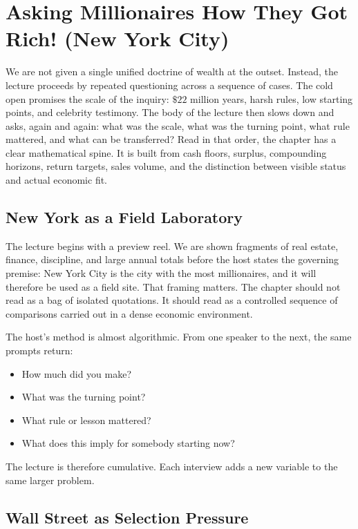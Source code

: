 \chapter{Asking Millionaires How They Got Rich! (New York City)}

We are not given a single unified doctrine of wealth at the outset. Instead, the lecture proceeds by repeated questioning across a sequence of cases. The cold open promises the scale of the inquiry: \(\$22\) million years, harsh rules, low starting points, and celebrity testimony. The body of the lecture then slows down and asks, again and again: what was the scale, what was the turning point, what rule mattered, and what can be transferred? Read in that order, the chapter has a clear mathematical spine. It is built from cash floors, surplus, compounding horizons, return targets, sales volume, and the distinction between visible status and actual economic fit.

\section{New York as a Field Laboratory}

The lecture begins with a preview reel. We are shown fragments of real estate, finance, discipline, and large annual totals before the host states the governing premise: New York City is the city with the most millionaires, and it will therefore be used as a field site. That framing matters. The chapter should not read as a bag of isolated quotations. It should read as a controlled sequence of comparisons carried out in a dense economic environment.

The host's method is almost algorithmic. From one speaker to the next, the same prompts return:
\begin{itemize}
\item How much did you make?
\item What was the turning point?
\item What rule or lesson mattered?
\item What does this imply for somebody starting now?
\end{itemize}
The lecture is therefore cumulative. Each interview adds a new variable to the same larger problem.

\section{Wall Street as Selection Pressure}

